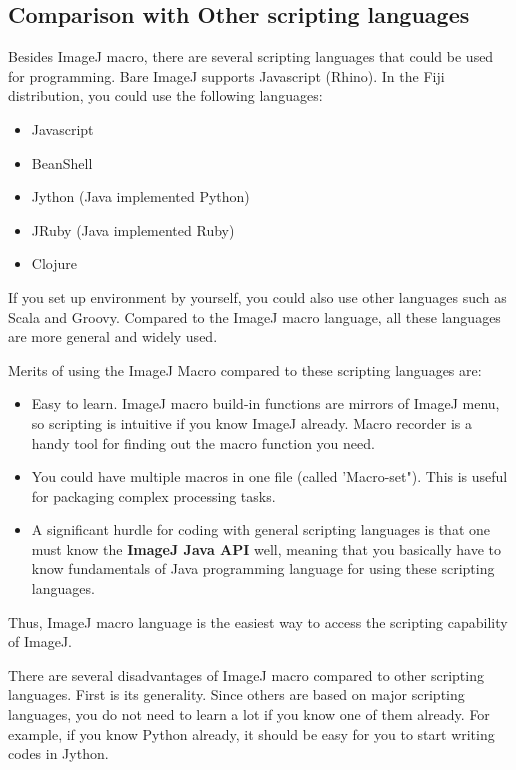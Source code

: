 \subsection{Comparison with Other scripting languages}

Besides ImageJ macro, there are several scripting languages that
could be used for programming. Bare ImageJ supports Javascript (Rhino).
In the Fiji distribution, you could use the following languages:

\begin{itemize}
 \item Javascript
 \item BeanShell
 \item Jython (Java implemented Python)
 \item JRuby (Java implemented Ruby)
 \item Clojure
 \end{itemize}

If you set up environment by yourself, you could also use other languages such as Scala and Groovy. 
Compared to the ImageJ macro language, all these languages are more general and widely used. 

Merits of using the ImageJ Macro compared to these scripting languages are: 
\begin{itemize}
\item Easy to learn. 
ImageJ macro build-in functions are mirrors of ImageJ menu, so scripting is intuitive if you know ImageJ already. 
Macro recorder is a handy tool for finding out the macro function you need. 

\item You could have multiple macros in one file (called 'Macro-set"). 
This is useful for packaging complex processing tasks.

\item A significant hurdle for coding with general scripting languages is that one must know the 
\textbf{ImageJ Java API} well, meaning that you basically have to know 
fundamentals of Java programming language for using these scripting languages. 
\end{itemize}

Thus, ImageJ macro language is the easiest way to access the scripting
capability of ImageJ.

There are several disadvantages of ImageJ macro compared to other
scripting languages. First is its generality. Since others are based on major scripting languages, you do not need to learn a lot if you know one of them already. For example, if you know Python already, 
it should be easy for you to start writing codes in Jython. 

